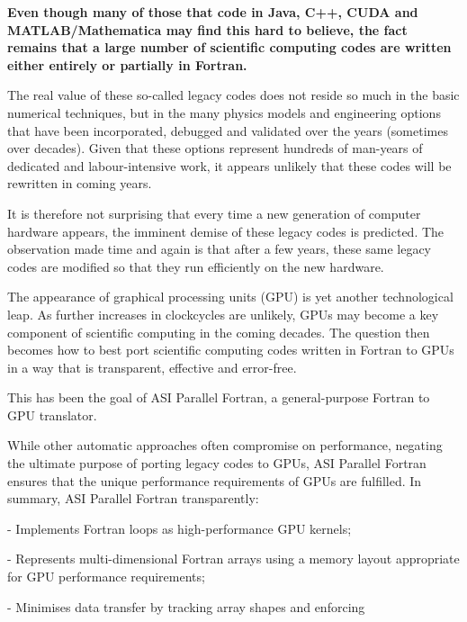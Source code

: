 




\bf
{}
\ms \noi
{}
\rm
\bs \noi
Even though many of those that code in Java, C++, CUDA and
MATLAB/Mathematica may find this hard to believe, the fact
remains that a large number of scientific computing codes
are written either entirely or partially in Fortran.
\par \noi
The real value of these so-called
legacy codes does not reside so much in the basic numerical
techniques, but in the many physics models and engineering
options that have been incorporated, debugged and validated
over the years (sometimes over decades). Given that these
options represent hundreds of man-years of dedicated and
labour-intensive work, it appears unlikely that these codes
will be rewritten in coming years.
\par \noi
It is therefore not surprising that every time a new generation
of computer hardware appears, the imminent demise of these
legacy codes is predicted. The observation made time and again
is that after a few years, these same legacy codes are modified
so that they run efficiently on the new hardware.
\par \noi
The appearance of graphical processing units (GPU) is yet
another technological leap. As further increases in clockcycles
are unlikely, GPUs may become a key component of scientific
computing in the coming decades. The question then becomes how
to best port scientific computing codes written in Fortran to
GPUs in a way that is transparent, effective and error-free.
\par \noi
This has been the goal of ASI Parallel Fortran, a general-purpose
Fortran to GPU translator.
\par \noi
While other automatic approaches often compromise on performance,
negating the ultimate purpose of porting legacy codes to GPUs,
ASI Parallel Fortran ensures that the unique performance requirements
of GPUs are fulfilled.
In summary, ASI Parallel Fortran transparently:
\par \noi
\item{-} Implements Fortran loops as high-performance GPU kernels;
\item{-} Represents multi-dimensional Fortran arrays using
a memory layout appropriate for GPU performance requirements;
\item{-} Minimises data transfer by tracking array shapes and enforcing
